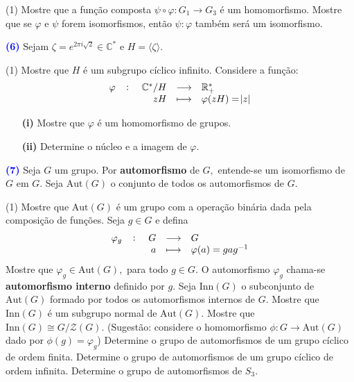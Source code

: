 \documentclass[12pt, a4paper]{article}
\newcommand{\negrito}[1]{\mbox{\boldmath{$#1$}}}
\begin{document}
\begin{tasks}[counter-format={(tsk[a])},label-width=3.6ex, label-format = {\bfseries}, column-sep = {0pt}](1)
\task[\textcolor{Floresta}{$\negrito{(a)} $}] Mostre que a função composta $\psi \circ \varphi \colon G_1 \to G_3$ é um homomorfismo.
\task[\textcolor{Floresta}{$\negrito{(b)} $}] Mostre que se $\varphi$ e $\psi$ forem isomorfismos, então $\psi \colon \varphi$ também será um isomorfismo.
\end{tasks}
\textcolor{blue}{\bf(6)}\label{62} Sejam $\zeta = e^{2 \pi i \sqrt{2}} \in \mathbb{C}^{*}$ e $H = \langle \zeta \rangle.$ 
\begin{tasks}[counter-format={(tsk[a])},label-width=3.6ex, label-format = {\bfseries}, column-sep = {0pt}](1)
\task[\textcolor{Floresta}{$\negrito{(a)} $}] Mostre que $H$ é um subgrupo cíclico infinito.
\task[\textcolor{Floresta}{$\negrito{(b)} $}] Considere a função:
\[
\fullfunction{\varphi}{\mathbb{C}^{*}/H}{\mathbb{R}^{*}_{+}}{zH}{\varphi(zH) = \abs{z}}
\]
\begin{itemize}
    \item[\textbf{(i)}] Mostre que $\varphi$ é um homomorfismo de grupos.
    \item[\textbf{(ii)}] Determine o núcleo e a imagem de $\varphi.$
\end{itemize}
\end{tasks}
\textcolor{blue}{\bf(7)}\label{63} Seja $G$ um grupo. Por \textbf{automorfismo} de $G,$ entende-se um isomorfismo de $G$ em $G.$ Seja $\mbox{Aut}(G)$ o conjunto de todos os automorfismos de $G.$ 
\begin{tasks}[counter-format={(tsk[a])},label-width=3.6ex, label-format = {\bfseries}, column-sep = {0pt}](1)
\task[\textcolor{Floresta}{$\negrito{(a)} $}] Mostre que $\mbox{Aut}(G)$ é um grupo com a operação binária dada pela composição de funções.
\task[\textcolor{Floresta}{$\negrito{(b)} $}] Seja $g \in G$ e defina
\[
\fullfunction{\varphi_g}{G}{G}{a}{\varphi(a) = gag^{-1}}
\]
Mostre que $\varphi_g \in \mbox{Aut}(G),$ para todo $g \in G.$ O automorfismo $\varphi_g$ chama-se \textbf{automorfismo interno} definido por $g.$
\task[\textcolor{Floresta}{$\negrito{(c)} $}] Seja $\mbox{Inn}(G)$ o subconjunto de $\mbox{Aut}(G)$ formado por todos os automorfismos internos de $G.$ Mostre que $\mbox{Inn}(G)$ é um subgrupo normal de $\mbox{Aut}(G).$ 
\task[\textcolor{Floresta}{$\negrito{(d)} $}] Mostre que $\mbox{Inn}(G) \cong G/ \mathcal{Z}(G).$ (Sugestão: considere o homomorfismo $\phi \colon G \to \mbox{Aut}(G)$ dado por $\phi(g) = \varphi_g$)
\task[\textcolor{Floresta}{$\negrito{(e)} $}] Determine o grupo de automorfismos de um grupo cíclico de ordem finita.
\task[\textcolor{Floresta}{$\negrito{(f)} $}] Determine o grupo de automorfismos de um grupo cíclico de ordem infinita.
\task[\textcolor{Floresta}{$\negrito{(g)} $}] Determine o grupo de automorfismos de $S_3.$
\end{tasks}
\end{document}
